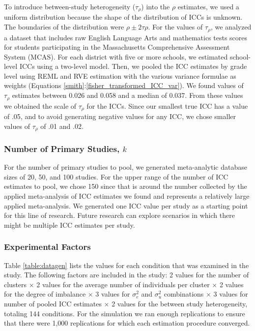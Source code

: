 To introduce between-study heterogeneity ($\tau_{\rho}$) into the $\rho$ estimates, we used a uniform distribution because the shape of the distribution of ICCs is unknown. The boundaries of the distribution were $\rho \pm 2 \tau{\rho}$. For the values of $\tau_{\rho}$, we analyzed a dataset that includes raw English Language Arts and mathematics tests scores for students participating in the Massachusetts Comprehensive Assessment System (MCAS). For each district with five or more schools, we estimated school-level ICCs using a two-level model. Then, we pooled the ICC estimates by grade level using REML and RVE estimation with the various variance formulae as weights (Equations \ref{smith}:\ref{fisher_transformed_ICC_var}). We found values of $\tau_{\rho}$ estimates between 0.026 and 0.058 and a median of 0.037. From these values we obtained the scale of $\tau_{\rho}$ for the ICCs. Since our smallest true ICC has a value of .05, and to avoid generating negative values for any ICC, we chose smaller values of $\tau_{\rho}$ of .01 and .02.


\subsubsection{Number of Primary Studies, \texorpdfstring{$k$}{k} }



For the number of primary studies to pool, we generated meta-analytic database sizes of 20, 50, and 100 studies. For the upper range of the number of ICC estimates to pool, we chose 150 since that is around the number collected by the applied meta-analysis of ICC estimates we found \cite{stockford2009, kivlighan2020} and represents a relatively large applied meta-analysis. We generated one ICC value per study as a starting point for this line of research. Future research can explore scenarios in which there might be multiple ICC estimates per study. 


\subsubsection{Experimental Factors}

Table \ref{table:datagen} lists the values for each condition that was examined in the study. The following factors are included in the study: 2 values for the number of clusters $\times$ 2 values for the average number of individuals per cluster $\times$ 2 values for the degree of imbalance $\times$ 3 values for $\sigma^2_e$ and $\sigma^2_u$ combinations $\times$ 3 values for number of pooled ICC estimates $\times$ 2 values for the between study heterogeneity, totaling 144 conditions. For the simulation we ran enough replications to ensure that there were 1,000 replications for which each estimation procedure converged.

